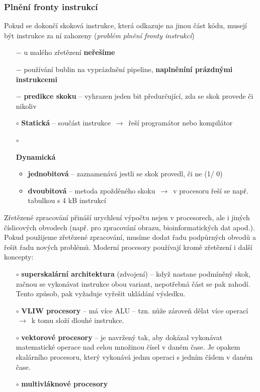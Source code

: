 \subsubsection*{Plnění fronty instrukcí}
Pokud se dokončí skoková instrukce, která odkazuje na jinou část kódu, musejí být instrukce za ní zahozeny (\textit{problém plnění fronty instrukcí})
\begin{itemize}
	\item[$-$]{u malého zřetězení \textbf{neřešíme}}
	\item[$-$]{používání bublin na vyprázdnění pipeline, \textbf{naplněníní prázdnými instrukcemi}}
	\item[$-$]{\textbf{predikce skoku} -- vyhrazen jeden bit předurčující, zda se skok provede či nikoliv}
\end{itemize}
\begin{itemize}
	\item[$\circ$]{\textbf{Statická} -- součást instrukce $\,\to\,$ řeší programátor nebo kompilátor}
	\item[$\circ$]{\textbf{Dynamická} 
			\begin{itemize}
					\item{\textbf{jednobitová} -- zaznamenává jestli se skok provedl, či ne (1/ 0)}
					\item{\textbf{dvoubitová} -- metoda zpožděného skoku $\,\to\,$ v procesoru řeší se např. tabulkou s 4 kB instrukcí}
			\end{itemize}
		}
\end{itemize}
Zřetězené zpracování přináší urychlení výpočtu nejen v procesorech, ale i jiných číslicových obvodech (např. pro zpracování obrazu, bioinformatických dat apod.). Pokud použijeme zřetězené zpracování, musíme dodat řadu podpůrných obvodů a řešit řadu nových problémů. Moderní procesory používají kromě zřetězení i další koncepty:
\begin{itemize}
	\item[$\circ$]{\textbf{superskalární architektura} (zdvojení) -- když nastane podmíněný skok, začnou se vykonávat instrukce obou variant, nepotřebná část se pak zahodí. Tento způsob, pak vyžaduje vyřešit ukládání výsledku.}
	\item[$\circ$]{\textbf{VLIW procesory} -- má více ALU -- tzn. nůže zároveň dělat více operací $\,\to\,$ k tomu složí dlouhé instrukce.}
	\item[$\circ$]{\textbf{vektorové procesory} -- je navržený tak, aby dokázal vykonávat matematické operace nad celou množinou čísel v daném čase. Je opakem skalárního procesoru, který vykonává jednu operaci s jedním číslem v daném čase. }
	\item[$\circ$]{\textbf{multivláknové procesory} }
\end{itemize}
